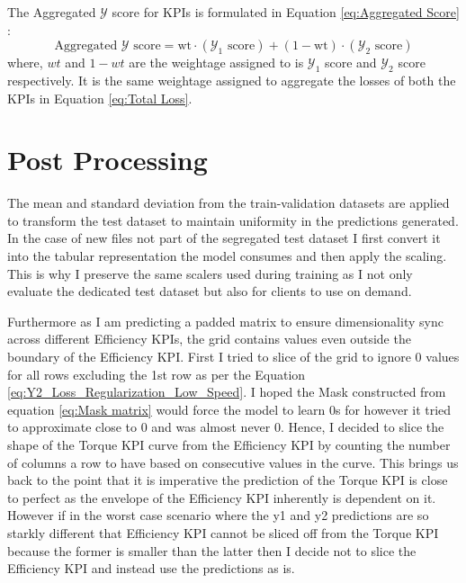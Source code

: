 \documentclass{report} %
\begin{document}
The Aggregated $\mathcal{Y}$ score for \ac{KPI}s is formulated in Equation \ref{eq:Aggregated Score} :
\begin{equation}
    \text{Aggregated $\mathcal{Y}$ score} = \text{wt} \cdot (\text{$\mathcal{Y}_1$ score}) + (1-\text{wt}) \cdot (\text{$\mathcal{Y}_2$ score})
    \label{eq:Aggregated Score}
\end{equation}
where, $wt$ and  $1-wt$ are the weightage assigned to is $\mathcal{Y}_1$ score and $\mathcal{Y}_2$ score respectively. 
It is the same weightage assigned to aggregate the losses of both the \ac{KPI}s in Equation \ref{eq:Total Loss}.

\section{Post Processing}\label{sec:Post Processing}
The mean and standard deviation from the train-validation datasets are applied to transform the test dataset to maintain uniformity in the predictions generated.
In the case of new files not part of the segregated test dataset I first convert it into the tabular representation the model consumes and then apply the scaling.
This is why I preserve the same scalers used during training as I not only evaluate the dedicated test dataset but also for clients to use on demand. 

Furthermore as I am predicting a padded matrix to ensure dimensionality sync across different Efficiency \ac{KPI}s, the grid contains values even outside the boundary 
of the Efficiency \ac{KPI}.
First I tried to slice of the grid to ignore 0 values for all rows excluding the 1st row as per the Equation \ref{eq:Y2_Loss_Regularization_Low_Speed}.
I hoped the Mask constructed from equation \ref{eq:Mask matrix} would force the model to learn 0s for however it tried to approximate close to 0 and was almost never 0.
Hence, I decided to slice the shape of the Torque \ac{KPI} curve from the Efficiency \ac{KPI} by counting the number of columns a row to have based on consecutive values in the curve.
This brings us back to the point that it is imperative the prediction of the Torque \ac{KPI} is close to perfect as the envelope of the Efficiency \ac{KPI} inherently is dependent on it.
However if in the worst case scenario where the y1 and y2 predictions are so starkly different that Efficiency \ac{KPI} cannot be sliced off from 
the Torque \ac{KPI} because the former is smaller than the latter then I decide not to slice the Efficiency \ac{KPI} and instead use the predictions as is.
\end{document}
